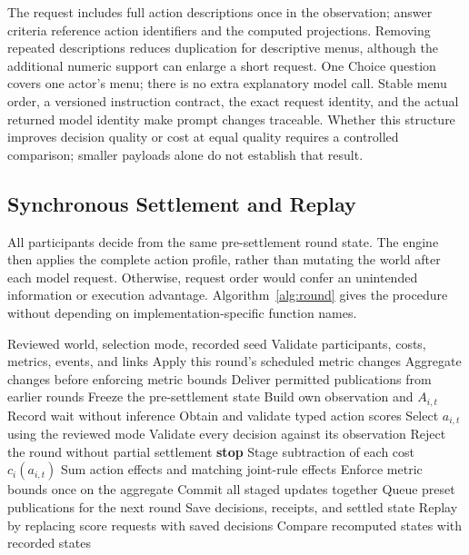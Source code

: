 The request includes full action descriptions once in the observation;
answer criteria reference action identifiers and the computed projections.
Removing repeated descriptions reduces duplication for descriptive menus,
although the additional numeric support can enlarge a short request. One Choice
question covers one actor's menu; there is no extra explanatory model call.
Stable menu order, a versioned instruction contract, the exact request identity,
and the actual returned model identity make prompt changes traceable. Whether
this structure improves decision quality or cost at equal quality requires a
controlled comparison; smaller payloads alone do not establish that result.

\subsection{Synchronous Settlement and Replay}\label{sec:settlement}
All participants decide from the same pre-settlement round state. The engine
then applies the complete action profile, rather than mutating the world
after each model request. Otherwise, request order would confer an unintended
information or execution advantage. Algorithm~\ref{alg:round} gives the
procedure without depending on implementation-specific function names.

\begin{algorithm}[t]
\caption{World execution and recorded replay}
\label{alg:round}
\footnotesize
\begin{algorithmic}[1]
\Require Reviewed world, selection mode, recorded seed
\State Validate participants, costs, metrics, events, and links
  \State Apply this round's scheduled metric changes
  \State Aggregate changes before enforcing metric bounds
  \State Deliver permitted publications from earlier rounds
  \State Freeze the pre-settlement state
    \State Build own observation and $A_{i,t}$
      \State Record wait without inference
    \Else
      \State Obtain and validate typed action scores
      \State Select $a_{i,t}$ using the reviewed mode
    \EndIf
  \EndFor
  \State Validate every decision against its observation
    \State Reject the round without partial settlement
    \State \textbf{stop}
  \Else
    \State Stage subtraction of each cost $c_i(a_{i,t})$
    \State Sum action effects and matching joint-rule effects
    \State Enforce metric bounds once on the aggregate
    \State Commit all staged updates together
    \State Queue preset publications for the next round
    \State Save decisions, receipts, and settled state
  \EndIf
\EndFor
\State Replay by replacing score requests with saved decisions
\State Compare recomputed states with recorded states
\end{algorithmic}
\end{algorithm}

